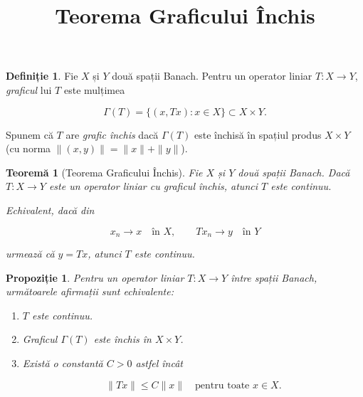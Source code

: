 \documentclass[12pt]{article}
\title{Teorema Graficului Închis}
\author{}
\date{}
\theoremstyle{definition}
\newtheorem{definition}{Definiție}
\theoremstyle{plain}
\newtheorem{theorem}{Teoremă}
\newtheorem{proposition}{Propoziție}
\begin{document}
\maketitle

\begin{definition}
Fie $X$ și $Y$ două spații Banach. Pentru un operator liniar $T : X \to Y$, \emph{graficul} lui $T$ este mulțimea


\[
\Gamma(T) = \{ (x, Tx) : x \in X \} \subset X \times Y.
\]


Spunem că $T$ are \emph{grafic închis} dacă $\Gamma(T)$ este închisă în spațiul produs $X \times Y$ (cu norma
$\|(x,y)\| = \|x\| + \|y\|$).
\end{definition}

\begin{theorem}[Teorema Graficului Închis]
Fie $X$ și $Y$ două spații Banach. Dacă $T : X \to Y$ este un operator liniar cu graficul închis, atunci $T$ este continuu.

Echivalent, dacă din


\[
x_n \to x \quad \text{în } X, \qquad Tx_n \to y \quad \text{în } Y
\]


urmează că $y = Tx$, atunci $T$ este continuu.
\end{theorem}

\begin{proposition}
Pentru un operator liniar $T : X \to Y$ între spații Banach, următoarele afirmații sunt echivalente:
\begin{enumerate}
    \item[(i)] $T$ este continuu.
    \item[(ii)] Graficul $\Gamma(T)$ este închis în $X \times Y$.
    \item[(iii)] Există o constantă $C > 0$ astfel încât
    

\[
    \|Tx\| \le C \|x\| \quad \text{pentru toate } x \in X.
    \]


\end{enumerate}
\end{proposition}
\end{document}
